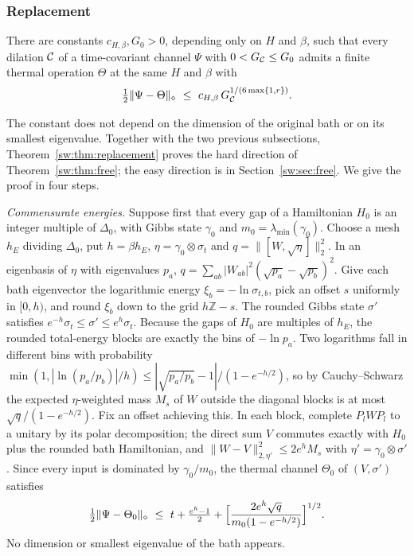 \subsubsection{Replacement}

\begin{theorem}[Replacement]\label{sw:thm:replacement}
There are constants $c_{H,\beta},G_0>0$, depending only on $H$ and $\beta$, such that every dilation $\mathcal C$ of a time-covariant channel $\Psi$ with $0<G_{\mathcal C}\le G_0$ admits a finite thermal operation $\Theta$ at the same $H$ and $\beta$ with
\[
\tfrac12\|\Psi-\Theta\|_\diamond\ \le\ c_{H,\beta}\,G_{\Dil}^{1/(6\max\{1,r\})}.
\]
\end{theorem}

The constant does not depend on the dimension of the original bath or on its smallest eigenvalue. Together with the two previous subsections, Theorem~\ref{sw:thm:replacement} proves the hard direction of Theorem~\ref{sw:thm:free}; the easy direction is in Section~\ref{sw:sec:free}. We give the proof in four steps.

\emph{Commensurate energies.} Suppose first that every gap of a Hamiltonian $H_0$ is an integer multiple of $\Delta_0$, with Gibbs state $\gamma_0$ and $m_0=\lambda_{\min}(\gamma_0)$. Choose a mesh $h_E$ dividing $\Delta_0$, put $h=\beta h_E$, $\eta=\gamma_0\otimes\sigma_t$ and $q=\|[W,\sqrt\eta]\|_2^2$. In an eigenbasis of $\eta$ with eigenvalues $p_a$, $q=\sum_{ab}|W_{ab}|^2(\sqrt{p_a}-\sqrt{p_b})^2$. Give each bath eigenvector the logarithmic energy $\xi_b=-\ln\sigma_{t,b}$, pick an offset $s$ uniformly in $[0,h)$, and round $\xi_b$ down to the grid $h\mathbb Z-s$. The rounded Gibbs state $\sigma'$ satisfies $e^{-h}\sigma_t\le\sigma'\le e^h\sigma_t$. Because the gaps of $H_0$ are multiples of $h_E$, the rounded total-energy blocks are exactly the bins of $-\ln p_a$. Two logarithms fall in different bins with probability $\min(1,|\ln(p_a/p_b)|/h)\le|\sqrt{p_a/p_b}-1|/(1-e^{-h/2})$, so by Cauchy--Schwarz the expected $\eta$-weighted mass $M_s$ of $W$ outside the diagonal blocks is at most $\sqrt q/(1-e^{-h/2})$. Fix an offset achieving this. In each block, complete $P_lWP_l$ to a unitary by its polar decomposition; the direct sum $V$ commutes exactly with $H_0$ plus the rounded bath Hamiltonian, and $\|W-V\|^2_{2,\eta'}\le2e^hM_s$ with $\eta'=\gamma_0\otimes\sigma'$. Since every input is dominated by $\gamma_0/m_0$, the thermal channel $\Theta_0$ of $(V,\sigma')$ satisfies
\[
\tfrac12\|\Psi-\Theta_0\|_\diamond\ \le\ t+\tfrac{e^h-1}2+\Bigl[\frac{2e^h\sqrt q}{m_0(1-e^{-h/2})}\Bigr]^{1/2}.
\]
No dimension or smallest eigenvalue of the bath appears.

